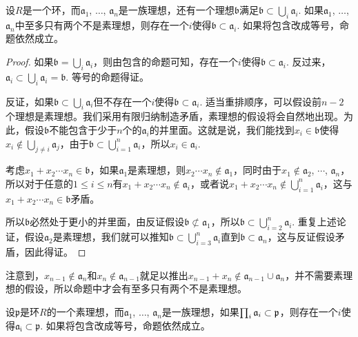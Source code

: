 \begin{pro} \label{primeav}设$R$是一个环，而$\mathfrak{a}_1$, $\dots$, $\mathfrak{a}_n$是一族理想，还有一个理想$\mathfrak{b}$满足$\mathfrak{b}\subset \bigcup_i \mathfrak{a}_i$. 如果$\mathfrak{a}_1$, $\dots$, $\mathfrak{a}_n$中至多只有两个不是素理想，则存在一个$i$使得$\mathfrak{b}\subset \mathfrak{a}_i$. 如果将包含改成等号，命题依然成立。
\end{pro}

\begin{proof}
	如果$\mathfrak{b}=\bigcup_i \mathfrak{a}_i$，则由包含的命题可知，存在一个$i$使得$\mathfrak{b}\subset \mathfrak{a}_i$. 反过来，$\mathfrak{a}_i\subset \bigcup_i \mathfrak{a}_i=\mathfrak{b}$. 等号的命题得证。

	反证，如果$\mathfrak{b}\subset \bigcup_i \mathfrak{a}_i$但不存在一个$i$使得$\mathfrak{b}\subset \mathfrak{a}_i$. 适当重排顺序，可以假设前$n-2$个理想是素理想。我们采用有限归纳制造矛盾，素理想的假设将会自然地出现。为此，假设$\mathfrak{b}$不能包含于少于$n$个的$\mathfrak{a}_i$的并里面。这就是说，我们能找到$x_i\in \mathfrak{b}$使得$x_i\not\in \bigcup_{j\neq i}\mathfrak{a}_j$，由于$\mathfrak{b}\subset \bigcup_{i=1}^n \mathfrak{a}_i$，所以$x_i\in \mathfrak{a}_i$.

	考虑$x_1+x_2\cdots x_n\in \mathfrak{b}$，如果$\mathfrak{a}_1$是素理想，则$x_2\cdots x_n\not\in \mathfrak{a}_1$，同时由于$x_1\not\in \mathfrak{a}_2$, $\cdots$, $\mathfrak{a}_n$，所以对于任意的$1\leq i \leq n$有$x_1+x_2\cdots x_n\not\in \mathfrak{a}_i$，或者说$x_1+x_2\cdots x_n\not\in \bigcup_{i=1}^n \mathfrak{a}_i$，这与$x_1+x_2\cdots x_n\in \mathfrak{b}$矛盾。

	所以$\mathfrak{b}$必然处于更小的并里面，由反证假设$\mathfrak{b}\not\subset \mathfrak{a}_1$，所以$\mathfrak{b}\subset \bigcup_{i=2}^n \mathfrak{a}_i$. 重复上述论证，假设$\mathfrak{a}_2$是素理想，我们就可以推知$\mathfrak{b}\subset \bigcup_{i=3}^n \mathfrak{a}_i$直到$\mathfrak{b}\subset \mathfrak{a}_n$，这与反证假设矛盾，因此得证。 
\end{proof}

注意到，$x_{n-1}\not\in \mathfrak{a}_n$和$x_{n}\not\in \mathfrak{a}_{n-1}$就足以推出$x_{n-1}+x_{n}\not\in \mathfrak{a}_{n-1}\cup \mathfrak{a}_n$，并不需要素理想的假设，所以命题中才会有至多只有两个不是素理想。

\begin{pro} \label{primeau}设$\mathfrak{p}$是环$R$的一个素理想，而$\mathfrak{a}_1$, $\dots$, $\mathfrak{a}_n$是一族理想，如果$\prod_i \mathfrak{a}_i\subset \mathfrak{p}$，则存在一个$i$使得$\mathfrak{a_i}\subset \mathfrak{p}$. 如果将包含改成等号，命题依然成立。
\end{pro}

